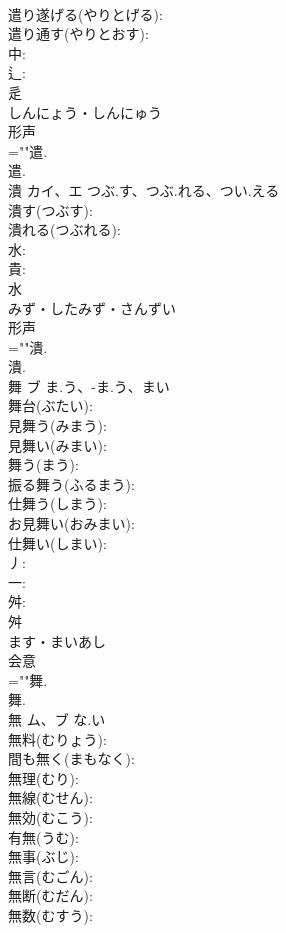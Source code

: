 \documentclass[8pt]{extreport}
\begin{document}
\begin{CJK}{UTF8}{min}
\\	遣り遂げる(やりとげる): 
\\	遣り通す(やりとおす): 
\\	中: 
\\	辶: 
\\	辵	
\\	しんにょう・しんにゅう	
\\	形声 
\\	=""遣.
\\	遣.
\\	潰	カイ、エ	つぶ.す、つぶ.れる、つい.える		
\\	潰す(つぶす): 
\\	潰れる(つぶれる): 
\\	水: 
\\	貴: 
\\	水	
\\	みず・したみず・さんずい	
\\	形声 
\\	=""潰.
\\	潰.
\\	舞	ブ	ま.う、-ま.う、まい		
\\	舞台(ぶたい): 
\\	見舞う(みまう): 
\\	見舞い(みまい): 
\\	舞う(まう): 
\\	振る舞う(ふるまう): 
\\	仕舞う(しまう): 
\\	お見舞い(おみまい): 
\\	仕舞い(しまい): 
\\	丿: 
\\	一: 
\\	舛: 
\\	舛	
\\	ます・まいあし	
\\	会意 
\\	=""舞.
\\	舞.
\\	無	ム、ブ	な.い		
\\	無料(むりょう): 
\\	間も無く(まもなく): 
\\	無理(むり): 
\\	無線(むせん): 
\\	無効(むこう): 
\\	有無(うむ): 
\\	無事(ぶじ): 
\\	無言(むごん): 
\\	無断(むだん): 
\\	無数(むすう): 

\end{CJK}
\end{document}
